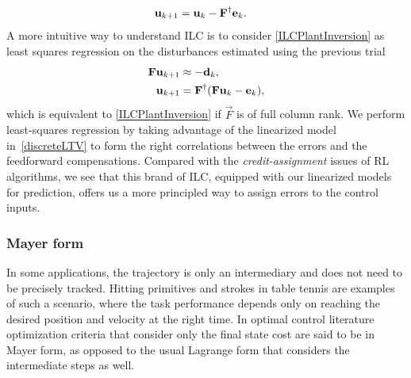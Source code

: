 %
\begin{equation}
\begin{aligned}
\boldsymbol{\mathrm{u}}_{k+1} &= \boldsymbol{\mathrm{u}}_k - \boldsymbol{\mathrm{F}}^{\dagger}\boldsymbol{\mathrm{e}}_k.
\end{aligned}
\label{ILCPlantInversion}
\end{equation}
%
%
\noindent A more intuitive way to understand ILC is to consider \eqref{ILCPlantInversion} as least squares regression on the disturbances estimated using the previous trial
%
\begin{equation}
\begin{aligned}
\boldsymbol{\mathrm{F}}\boldsymbol{\mathrm{u}}_{k+1} &\approx -\boldsymbol{\mathrm{d}}_{k},\\
\boldsymbol{\mathrm{u}}_{k+1} &= \boldsymbol{\mathrm{F}}^{\dagger}(\boldsymbol{\mathrm{F}}\boldsymbol{\mathrm{u}}_{k} - \boldsymbol{\mathrm{e}}_k),
\end{aligned}
\label{ILCasRegression}
\end{equation}
%
\noindent which is equivalent to \eqref{ILCPlantInversion} if $\vec{F}$ is of full column rank. We perform least-squares regression by taking advantage of the linearized model in~\eqref{discreteLTV} to form the right correlations between the errors and the feedforward compensations. Compared with the \emph{credit-assignment} issues of RL algorithms, we see that this brand of ILC, equipped with our linearized models for prediction, offers us a more principled way to assign errors to the control inputs.

\subsubsection{Mayer form}

In some applications, the trajectory is only an intermediary and does not need to be precisely tracked. Hitting primitives and strokes in table tennis are examples of such a scenario, where the task performance depends only on reaching the desired position and velocity at the right time. In optimal control literature~\cite{Liberzon11} optimization criteria that consider only the final state cost are said to be in Mayer form, as opposed to the usual Lagrange form that considers the intermediate steps as well.


